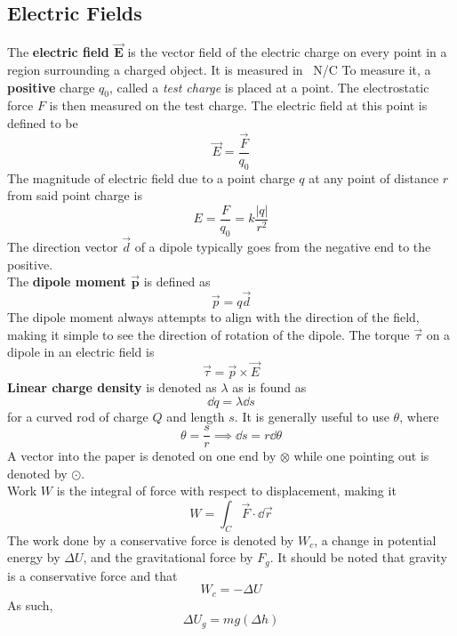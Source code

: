 \documentclass[./Electricity and Magnetism.tex]{subfiles}
\begin{document}
		\subsection{Electric Fields}
			The \textbf{electric field \(\bm{\vec{E}}\)} is the vector field of the electric charge on every point in a region surrounding a charged object. It is measured in \SI{}{N/C} To measure it, a \textbf{positive} charge \(q_0\), called a \textit{test charge} is placed at a point. The electrostatic force \(F\) is then measured on the test charge. The electric field at this point is defined to be
				\[\vec{E} = \frac{\vec{F}}{q_0}\]
				The magnitude of electric field due to a point charge \(q\) at any point of distance \(r\) from said point charge is
				\[E = \frac{F}{q_0} = k\frac{|q|}{r^2}\]
			The direction vector \(\vec{d}\) of a dipole typically goes from the negative end to the positive. \\
			The \textbf{dipole moment \(\bm{\vec{p}}\)} is defined as
				\[\vec{p} = q\vec{d}\]
				The dipole moment always attempts to align with the direction of the field, making it simple to see the direction of rotation of the dipole.
			The torque \(\vec{\tau}\) on a dipole in an electric field is
				\[\vec{\tau} = \vec{p} \times \vec{E}\]
			\textbf{Linear charge density} is denoted as \(\lambda\) as is found as
				\[\dd{q} = \lambda \dd{s}\]
				for a curved rod of charge \(Q\) and length \(s\). It is generally useful to use \(\theta\), where
				\[\theta = \frac{s}{r} \implies \dd{s} = r\dd{\theta}\]
			A vector into the paper is denoted on one end by \(\otimes\) while one pointing out is denoted by \(\odot\). \\
			Work \(W\) is the integral of force with respect to displacement, making it
				\[W = \int_C \vec{F} \cdot \dd{\vec{r}}\]
				The work done by a conservative force is denoted by \(W_c\), a change in potential energy by \(\Delta U\), and the gravitational force by \(F_g\). It should be noted that gravity is a conservative force and that
				\[W_c = -\Delta U\]
				As such,
				\[\Delta U_g = mg(\Delta h)\]
\end{document}
